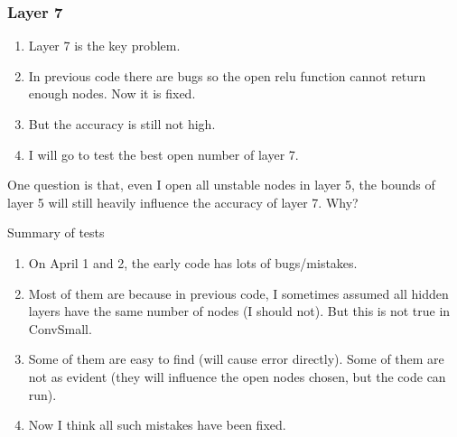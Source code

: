 \documentclass[10pt,table, UTF8]{beamer}
\theoremstyle{mydef}
\numberwithin{equation}{section}
\begin{document}
\begin{frame}
	\frametitle{Layer 7}
	
	
	\begin{enumerate}
		\item Layer 7 is the key problem.
		
		\vspace*{2ex}
		
		\item In previous code there are bugs so the open relu function cannot return enough nodes. Now it is fixed.
		
		\vspace*{2ex}
		
		\item  But the accuracy is still not high.
		
		\vspace*{2ex}
		
		\item  I will go to test the best open number of layer 7.
		
		
	\end{enumerate}
	\vspace*{2ex}
	
	One question is that, even I open all unstable nodes in layer 5, the bounds of layer 5 will still heavily influence the accuracy of layer 7. Why?
	
	
\end{frame}

\begin{frame}{Summary of tests}
	\begin{enumerate}
		\item  On  April 1 and 2, the early code has lots of bugs/mistakes. 
		
		\vspace*{2ex}
		
		\item  Most of them are because in previous code, I sometimes assumed all hidden layers have the same number of nodes (I should not). But this is not true in ConvSmall.
		
		\vspace*{2ex}
		
		\item  Some of them are easy to find (will cause error directly). Some of them are not as evident (they will influence the open nodes chosen, but the code can run).
		
		\vspace*{2ex}
		
		\item  Now I think all such mistakes have been fixed.
	\end{enumerate}
\end{frame}
\end{document}
